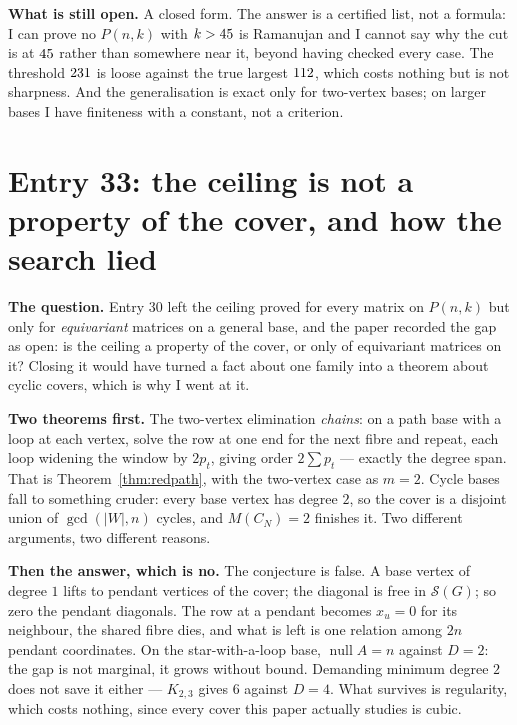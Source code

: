 \documentclass[12pt]{article}
\begin{document}
\textbf{What is still open.} A closed form. The answer is a certified list, not
a formula: I can prove no $P(n,k)$ with $k>45$ is Ramanujan and I
cannot say why the cut is at $45$ rather than somewhere near it,
beyond having checked every case. The threshold $231$ is loose
against the true largest $112$, which costs nothing but is not
sharpness. And the generalisation is exact only for two-vertex bases; on larger
bases I have finiteness with a constant, not a criterion.

\section*{Entry 33: the ceiling is not a property of the cover, and how the search lied}

\textbf{The question.} Entry 30 left the ceiling proved for every matrix on
$P(n,k)$ but only for \emph{equivariant} matrices on a general base, and the
paper recorded the gap as open: is the ceiling a property of the cover, or only
of equivariant matrices on it? Closing it would have turned a fact about one
family into a theorem about cyclic covers, which is why I went at it.

\textbf{Two theorems first.} The two-vertex elimination \emph{chains}: on a path
base with a loop at each vertex, solve the row at one end for the next fibre and
repeat, each loop widening the window by $2p_t$, giving order $2\sum p_t$ ---
exactly the degree span. That is Theorem~\ref{thm:redpath}, with the two-vertex
case as $m=2$. Cycle bases fall to something cruder: every base vertex has
degree $2$, so the cover is a disjoint union of $\gcd(|W|,n)$ cycles, and
$M(C_N)=2$ finishes it. Two different arguments, two different reasons.

\textbf{Then the answer, which is no.} The conjecture is false. A base vertex of
degree $1$ lifts to pendant vertices of the cover; the diagonal is free in
$\mathcal S(G)$; so zero the pendant diagonals. The row at a pendant becomes
$x_u=0$ for its neighbour, the shared fibre dies, and what is left is one
relation among $2n$ pendant coordinates. On the star-with-a-loop base,
$\operatorname{null}A=n$ against $D=2$: the gap is not marginal, it grows
without bound. Demanding minimum degree $2$ does not save it either --- $K_{2,3}$
gives $6$ against $D=4$. What survives is regularity, which costs nothing, since
every cover this paper actually studies is cubic.
\end{document}
